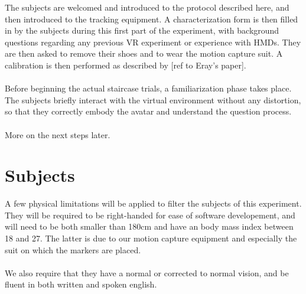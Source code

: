 The subjects are welcomed and introduced to the protocol described here, and then introduced to the tracking equipment. A characterization form is then filled in by the subjects during this first part of the experiment, with background questions regarding any previous VR experiment or experience with HMDs. They are then asked to remove their shoes and to wear the motion capture suit. A calibration is then performed as described by [ref to Eray's paper].
\\\\
Before beginning the actual staircase trials, a familiarization phase takes place. The subjects briefly interact with the virtual environment without any distortion, so that they correctly embody the avatar and understand the question process.
\\\\
More on the next steps later.

\section{Subjects}

A few physical limitations will be applied to filter the subjects of this experiment. They will be required to be right-handed for ease of software developement, and will need to be both smaller than 180cm and have an body mass index between 18 and 27. The latter is due to our motion capture equipment and especially the suit on which the markers are placed.
\\\\
We also require that they have a normal or corrected to normal vision, and be fluent in both written and spoken english.
